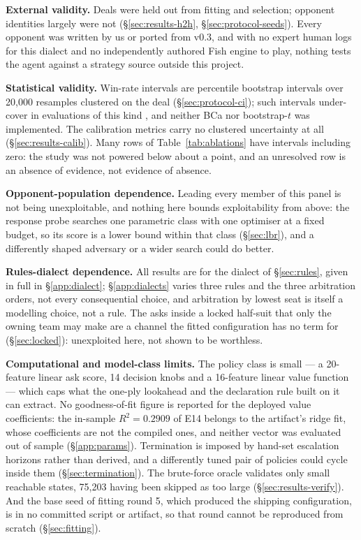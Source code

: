 \documentclass[11pt]{article}
\theoremstyle{definition}
\newcommand{\numValueRSq}{0.2909}
\newcommand{\numOracleStatesSkipped}{75{,}203}
\newcommand{\numAskFeats}{20}
\newcommand{\numValueFeats}{16}
\newcommand{\numKnobs}{14}
\newcommand{\numBootstrapDraws}{20{,}000}
\begin{document}
\textbf{External validity.} Deals were held out from fitting and selection;
opponent identities largely were not (\S\ref{sec:results-h2h},
\S\ref{sec:protocol-seeds}). Every opponent was written by us or ported from
v0.3, and with no expert human logs for this dialect and no independently
authored Fish engine to play, nothing tests the agent against a strategy source
outside this project.

\textbf{Statistical validity.} Win-rate intervals are percentile bootstrap
intervals over \numBootstrapDraws{} resamples clustered on the deal
(\S\ref{sec:protocol-ci}); such intervals under-cover in evaluations of this
kind \cite{jordan-rleval}, and neither BCa nor bootstrap-$t$ was implemented.
The calibration metrics carry no clustered uncertainty at all
(\S\ref{sec:results-calib}). Many rows of Table~\ref{tab:ablations} have
intervals including zero: the study was not powered below about a point, and an
unresolved row is an absence of evidence, not evidence of absence.

\textbf{Opponent-population dependence.} Leading every member of this panel is
not being unexploitable, and nothing here bounds exploitability from above: the
response probe searches one parametric class with one optimiser at a fixed
budget, so its score is a lower bound within that class (\S\ref{sec:lbr}), and a
differently shaped adversary or a wider search could do better.

\textbf{Rules-dialect dependence.} All results are for the dialect of
\S\ref{sec:rules}, given in full in \S\ref{app:dialect}; \S\ref{app:dialects}
varies three rules and the three arbitration orders, not every consequential
choice, and arbitration by lowest seat is itself a modelling choice, not a rule.
The asks inside a locked half-suit that only the owning team may make are a
channel the fitted configuration has no term for (\S\ref{sec:locked}):
unexploited here, not shown to be worthless.

\textbf{Computational and model-class limits.} The policy class is small --- a
\numAskFeats-feature linear ask score, \numKnobs{} decision knobs and a
\numValueFeats-feature linear value function --- which caps what the one-ply
lookahead and the declaration rule built on it can extract. No goodness-of-fit
figure is reported for the deployed value coefficients: the in-sample
$R^2 = \numValueRSq$ of E14 belongs to the artifact's ridge fit, whose
coefficients are not the compiled ones, and neither vector was evaluated out of
sample (\S\ref{app:params}). Termination is imposed by hand-set escalation
horizons rather than derived, and a differently tuned pair of policies could
cycle inside them (\S\ref{sec:termination}). The brute-force oracle validates
only small reachable states, \numOracleStatesSkipped{} having been skipped as
too large (\S\ref{sec:results-verify}). And the base seed of fitting round 5,
which produced the shipping configuration, is in no committed script or artifact,
so that round cannot be reproduced from scratch (\S\ref{sec:fitting}).
\end{document}
